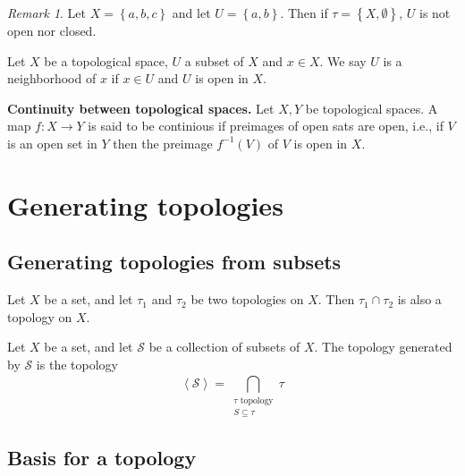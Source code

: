 \documentclass{article}
\theoremstyle{remark}
\newtheorem*{remark}{Remark}
\begin{document}
\begin{remark}
Let $X = \left\{ a,b,c \right\}$ and let $U = \left\{ a,b \right\}$. Then if $\tau = \left\{ X, \emptyset  \right\}$,
$U$ is not open nor closed.
\end{remark}

\begin{definition}[Neighbourhoods]
    Let $X$ be a topological space,  $U$ a subset of $X$ and $x \in  X$. We say $ U$ is a neighborhood of $x$ if $ x \in
    U $ and $U$ is open in $X$.
\end{definition}

\begin{theorem}
    \textbf{Continuity between topological spaces.}
Let $X,Y$ be topological spaces. A map $f: X \to Y$ is said to be continious if preimages of open sats are open, i.e.,
if $V$ is an open set in $Y$ then the preimage $f^{-1} \left( V \right)$ of $V$ is open in $X$.
\end{theorem}

\section{ Generating topologies}%
\label{sec:chapter_4_generating_topologies}

\subsection{Generating topologies from subsets}%
\label{sub:generating_topologies_from_subsets}



\begin{theorem}
    Let $X$ be a set, and let $\tau _{1}$ and $\tau _{2}$ be two topologies on $X$. Then $\tau _{1} \cap \tau _{2}$ is
    also a topology on $X$.
\end{theorem}

\begin{definition}
    Let $X$ be a set, and let $ \mathscr{S} $ be a collection of subsets of $X$. The topology generated by
    $\mathscr{S}$ is the topology \[
    \left<\mathscr{S}  \right> = \bigcap_{\substack{\tau  \text{ topology} \\ S \subseteq \tau  } }^{}  \tau
    \]

\end{definition}

\subsection{Basis for a topology}%
\label{sub:basis_for_a_topology}
\end{document}
